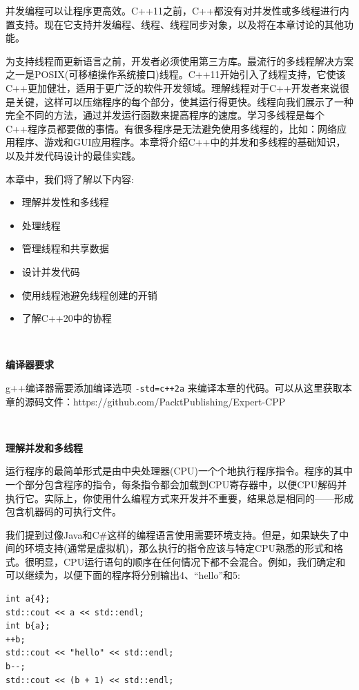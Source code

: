 并发编程可以让程序更高效。C++11之前，C++都没有对并发性或多线程进行内置支持。现在它支持并发编程、线程、线程同步对象，以及将在本章讨论的其他功能。 \par
为支持线程而更新语言之前，开发者必须使用第三方库。最流行的多线程解决方案之一是POSIX(可移植操作系统接口)线程。C++11开始引入了线程支持，它使该C++更加健壮，适用于更广泛的软件开发领域。理解线程对于C++开发者来说很是关键，这样可以压缩程序的每个部分，使其运行得更快。线程向我们展示了一种完全不同的方法，通过并发运行函数来提高程序的速度。学习多线程是每个C++程序员都要做的事情。有很多程序是无法避免使用多线程的，比如：网络应用程序、游戏和GUI应用程序。本章将介绍C++中的并发和多线程的基础知识，以及并发代码设计的最佳实践。\par
本章中，我们将了解以下内容: \par

\begin{itemize}
	\item 理解并发性和多线程
	\item 处理线程
	\item 管理线程和共享数据
	\item 设计并发代码
	\item 使用线程池避免线程创建的开销
	\item 了解C++20中的协程
\end{itemize}

\noindent\textbf{}\ \par
\textbf{编译器要求} \ \par
g++编译器需要添加编译选项 \texttt{-std=c++2a} 来编译本章的代码。可以从这里获取本章的源码文件：https:/​/github.​com/PacktPublishing/Expert-CPP \par

\noindent\textbf{}\ \par
\textbf{理解并发和多线程} \ \par
运行程序的最简单形式是由中央处理器(CPU)一个个地执行程序指令。程序的其中一个部分包含程序的指令，每条指令都会加载到CPU寄存器中，以便CPU解码并执行它。实际上，你使用什么编程方式来开发并不重要，结果总是相同的——形成包含机器码的可执行文件。 \par
我们提到过像Java和C\#这样的编程语言使用需要环境支持。但是，如果缺失了中间的环境支持(通常是虚拟机)，那么执行的指令应该与特定CPU熟悉的形式和格式。很明显，CPU运行语句的顺序在任何情况下都不会混合。例如，我们确定和可以继续为，以便下面的程序将分别输出4、“hello”和5: \par

\begin{lstlisting}[caption={}]
int a{4};
std::cout << a << std::endl;
int b{a};
++b;
std::cout << "hello" << std::endl;
b--;
std::cout << (b + 1) << std::endl;
\end{lstlisting}

